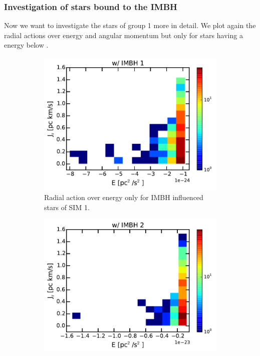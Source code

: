 \subsubsection{Investigation of stars bound to the \acl{IMBH}}
Now we want to investigate the stars of group 1 more in detail. We plot again the radial actions over energy and angular momentum but only for stars having a energy below . 
\begin{figure}[htbp]
\centering
	\begin{subfigure}{0.475\textwidth}
	\centering
	\includegraphics[width=\textwidth]{Plots/E_J_r_justIMBH_hist_IMBH1.pdf}
	\caption{Radial action over energy only for \ac{IMBH} influenced stars of SIM 1.}
	\label{fig:E_J_r_justIMBH_1}
	\end{subfigure}
	\hfill
	\begin{subfigure}{0.475\textwidth}
	\centering
	\includegraphics[width=\textwidth]{Plots/E_J_r_justIMBH_hist_IMBH2.pdf}

\end{subfigure}
\end{figure}
